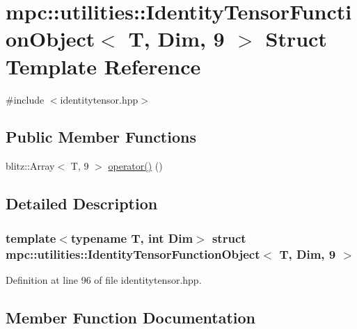 \hypertarget{structmpc_1_1utilities_1_1_identity_tensor_function_object_3_01_t_00_01_dim_00_019_01_4}{}\section{mpc\+:\+:utilities\+:\+:Identity\+Tensor\+Function\+Object$<$ T, Dim, 9 $>$ Struct Template Reference}
\label{structmpc_1_1utilities_1_1_identity_tensor_function_object_3_01_t_00_01_dim_00_019_01_4}


{\ttfamily \#include $<$identitytensor.\+hpp$>$}

\subsection*{Public Member Functions}
\begin{DoxyCompactItemize}
\item 
blitz\+::\+Array$<$ T, 9 $>$ \mbox{\hyperlink{structmpc_1_1utilities_1_1_identity_tensor_function_object_3_01_t_00_01_dim_00_019_01_4_aebd9f02d2f791762793ad352df2418bf}{operator()}} ()
\end{DoxyCompactItemize}


\subsection{Detailed Description}
\subsubsection*{template$<$typename T, int Dim$>$\newline
struct mpc\+::utilities\+::\+Identity\+Tensor\+Function\+Object$<$ T, Dim, 9 $>$}



Definition at line 96 of file identitytensor.\+hpp.



\subsection{Member Function Documentation}
\mbox{\label{structmpc_1_1utilities_1_1_identity_tensor_function_object_3_01_t_00_01_dim_00_019_01_4_aebd9f02d2f791762793ad352df2418bf}} 
